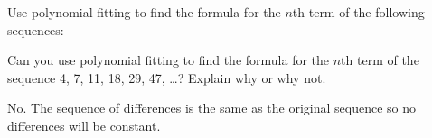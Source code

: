 \begin{questions}
\begin{answer}
	\end{answer}
	
	
	



\question Use polynomial fitting to find the formula for the $n$th term of the following sequences:

	\begin{answer}
	\end{answer}
	
	
	


\question Can you use polynomial fitting to find the formula for the $n$th term of the sequence 4, 7, 11, 18, 29, 47, \ldots?  Explain why or why not. 

	\begin{answer}
		No.  The sequence of differences is the same as the original sequence so no differences will be constant. 
	\end{answer}
	

\end{questions}
